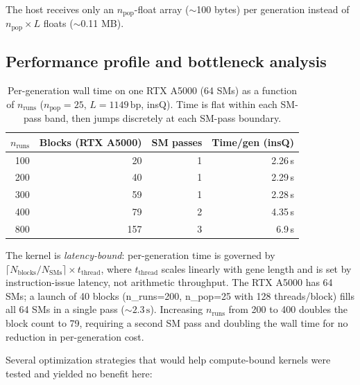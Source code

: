 \documentclass[11pt]{article}
\begin{document}
The host receives only an $n_{\text{pop}}$-float array ($\sim$100 bytes)
per generation instead of $n_{\text{pop}} \times L$ floats ($\sim$0.11 MB).

\subsection{Performance profile and bottleneck analysis}

\begin{table}[h]
\centering
\small
\begin{tabular}{rrrr}
\toprule
$n_{\text{runs}}$ & Blocks (RTX A5000) & SM passes & Time/gen (insQ) \\
\midrule
100 & 20 & 1 & 2.26\,s \\
200 & 40 & 1 & 2.29\,s \\
300 & 59 & 1 & 2.28\,s \\
400 & 79 & 2 & 4.35\,s \\
800 & 157 & 3 & 6.9\,s \\
\bottomrule
\end{tabular}
\caption{Per-generation wall time on one RTX A5000 (64 SMs) as a function of
$n_{\text{runs}}$ ($n_{\text{pop}} = 25$, $L = 1149\,\text{bp}$, insQ).
Time is flat within each SM-pass band, then jumps discretely at each SM-pass
boundary.}
\label{tab:occupancy}
\end{table}

The kernel is \emph{latency-bound}: per-generation time is governed by
$\lceil N_{\text{blocks}} / N_{\text{SMs}} \rceil \times t_{\text{thread}}$,
where $t_{\text{thread}}$ scales linearly with gene length and is set by
instruction-issue latency, not arithmetic throughput. The RTX A5000 has 64
SMs; a launch of 40 blocks (n\_runs=200, n\_pop=25 with 128 threads/block)
fills all 64 SMs in a single pass ($\sim 2.3\,\text{s}$). Increasing
$n_{\text{runs}}$ from 200 to 400 doubles the block count to 79,
requiring a second SM pass and doubling the wall time for no reduction in
per-generation cost.

Several optimization strategies that would help compute-bound kernels were
tested and yielded no benefit here:
\end{document}

